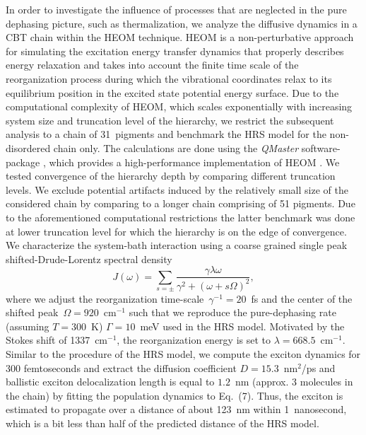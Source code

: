 \documentclass[journal=jacs,manuscript=article]{achemso}
\begin{document}
In order to investigate the influence of processes that are neglected in the pure dephasing picture, such as thermalization, we analyze the diffusive dynamics in a CBT chain within the HEOM technique. HEOM is a non-perturbative approach for simulating the excitation energy transfer dynamics that properly describes energy relaxation and takes into account the finite time scale of the reorganization process during which the vibrational coordinates relax to its equilibrium position in the excited state potential energy surface. Due to the computational complexity of HEOM, which scales exponentially with increasing system size and truncation level of the hierarchy, we restrict the subsequent analysis to a chain of 31~pigments and benchmark the HRS model for the non-disordered chain only. The calculations are done using the \textit{QMaster} software-package \cite{kreisbeck2014a}, which provides a high-performance implementation of HEOM \cite{kreisbeck2011a,kreisbeck2012a,kreisbeck2013a}. We tested convergence of the hierarchy depth by comparing different truncation levels. We exclude potential artifacts induced by the relatively small size of the considered chain by comparing to a longer chain comprising of 51 pigments. Due to the aforementioned computational restrictions the latter benchmark was done at lower truncation level for which the hierarchy is on the edge of convergence. We characterize the system-bath interaction using a coarse grained single peak shifted-Drude-Lorentz spectral density
\begin{equation}
 J(\omega)=\sum_{s=\pm}\frac{\gamma\lambda\omega}{\gamma^2+(\omega+s\Omega)^2},
\end{equation}
where we adjust the reorganization time-scale~$\gamma^{-1}=20$~fs and the center of the shifted peak~$\Omega=920$~cm$^{-1}$ such that we reproduce the pure-dephasing rate (assuming $T=300$~K) $\Gamma=10$~meV used in the HRS model. Motivated by the Stokes shift of 1337~cm$^{-1}$,\cite{Kivala2013} the reorganization energy is set to $\lambda=668.5$~cm$^{-1}$. Similar to the procedure of the HRS model, we compute the exciton dynamics for 300 femtoseconds and extract the diffusion coefficient $D=15.3$~nm$^2$/ps and ballistic exciton delocalization length is equal to $1.2$~nm (approx. 3 molecules in the chain) by fitting the population dynamics to Eq.~(7). Thus, the exciton is estimated to propagate over a distance of about 123~nm within 1~nanosecond, which is a bit less than half of the predicted distance of the HRS model.
\end{document}
